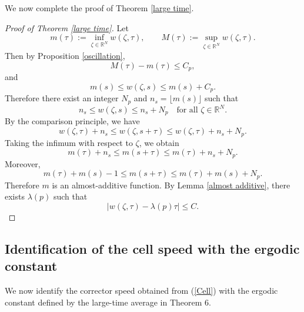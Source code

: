 \documentclass[preprint]{elsarticle}
\numberwithin{equation}{section}
\begin{document}
We now complete the proof of Theorem \ref{large time}.

\begin{proof}[Proof of Theorem \ref{large time}]
Let
$$
m(\tau):=\inf_{\zeta\in\mathbb R^N}w(\zeta,\tau),
\qquad
M(\tau):=\sup_{\zeta\in\mathbb R^N}w(\zeta,\tau).
$$
Then by Proposition \ref{oscillation},
$$
M(\tau)-m(\tau)\le C_p,
$$
and
$$
m(s)\le w(\zeta,s)\le m(s)+C_p.
$$
Therefore there exist an integer $N_p$ and
$
n_s=\lfloor m(s)\rfloor
$
such that
\begin{equation*}
n_s\le w(\zeta,s)\le n_s+N_p
\quad\text{for all }\zeta\in\mathbb R^N.
\end{equation*}
By the comparison principle, we have
\begin{equation*}
w(\zeta,\tau)+n_s
\le
w(\zeta,s+\tau)
\le
w(\zeta,\tau)+n_s+N_p.
\end{equation*}
Taking the infimum with respect to $\zeta$, we obtain
\begin{equation*}
m(\tau)+n_s
\le
m(s+\tau)
\le
m(\tau)+n_s+N_p.
\end{equation*}
Moreover,
\begin{equation*}
m(\tau)+m(s)-1
\le
m(s+\tau)
\le
m(\tau)+m(s)+N_p.
\end{equation*}
Therefore $m$ is an almost-additive function. By Lemma \ref{almost additive}, there exists $\lambda(p)$ such that
\begin{equation*}
|w(\zeta,\tau)-\lambda(p)\tau|\le C.
\end{equation*}
\end{proof}

\subsection{Identification of the cell speed with the ergodic constant}

We now identify the corrector speed obtained from (\ref{Cell}) with the ergodic constant defined by the large-time average in Theorem 6.
\end{document}
